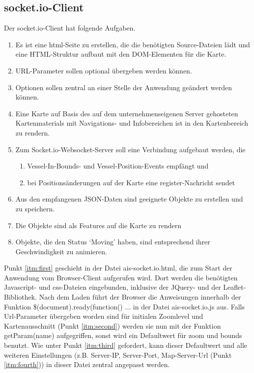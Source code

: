 \subsection{socket.io-Client}\label{socket.io-Client}
Der socket.io-Client hat folgende Aufgaben.
\begin{enumerate}
\item \label{itm:first} Es ist eine html-Seite zu erstellen, die die benötigten Source-Dateien lädt und eine HTML-Struktur aufbaut mit den DOM-Elementen für die Karte.
\item  \label{itm:second}URL-Parameter sollen optional übergeben werden können.
\item  \label{itm:third}Optionen sollen zentral an einer Stelle der Anwendung geändert werden können.
\item  \label{itm:fourth} Eine Karte auf Basis des auf dem unternehmenseigenen Server gehosteten Kartenmaterials mit Navigations- und Infobereichen ist in den Kartenbereich zu rendern.
\item  \label{itm:fifth} Zum Socket.io-Websocket-Server soll eine Verbindung aufgebaut werden, die
\begin{enumerate}
\item  \label{itm:fifthA}Vessel-In-Bounds- und Vessel-Position-Events empfängt und
\item \label{itm:fifthB}bei Positionsänderungen auf der Karte eine register-Nachricht sendet
\end{enumerate}
\item \label{itm:sixth} Aus den empfangenen JSON-Daten sind geeignete Objekte zu erstellen und zu speichern.
\item \label{itm:seventh}Die Objekte sind als Features auf die Karte zu rendern
\item \label{itm:eighth} Objekte, die den Status ‘Moving’ haben, sind entsprechend ihrer Geschwindigkeit zu animieren.
\end{enumerate}
Punkt \ref{itm:first} geschieht in der Datei ais-socket.io.html, die zum Start der Anwendung vom Browser-Client aufgerufen wird. Dort werden die benötigten Javascript- und css-Dateien eingebunden, inklusive der JQuery- und der Leaflet-Bibliothek. Nach dem Laden führt der Browser die Anweisungen innerhalb der Funktion \$(document).ready(function() {...} in der Datei ais-socket.io.js aus. Falls Url-Parameter übergeben worden sind für initialen Zoomlevel und Kartenausschnitt (Punkt \ref{itm:second}) werden sie nun mit der Funktion getParam(name) aufgegriffen, sonst wird ein Defaultwert für zoom und bounds benutzt. Wie unter Punkt \ref{itm:third} gefordert, kann dieser Defaultwert und alle weiteren Einstellungen (z.B. Server-IP, Server-Port, Map-Server-Url (Punkt \ref{itm:fourth})) in dieser Datei zentral angepasst werden.\\
